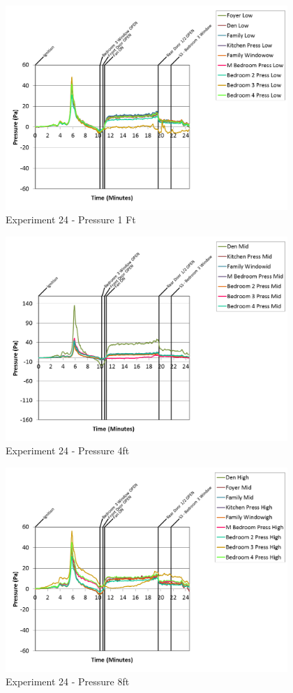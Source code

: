 \documentclass{article}
\begin{document}
\begin{appendices}
\begin{figure}[h!]
	\centering
	\includegraphics[height=3.05in]{0_Images/Results_Charts/Exp_24_Charts/Pressure1Ft.png}
	\caption{Experiment 24 - Pressure 1 Ft}
\end{figure}

\clearpage

\begin{figure}[h!]
	\centering
	\includegraphics[height=3.05in]{0_Images/Results_Charts/Exp_24_Charts/Pressure4ft.png}
	\caption{Experiment 24 - Pressure 4ft}
\end{figure}


\begin{figure}[h!]
	\centering
	\includegraphics[height=3.05in]{0_Images/Results_Charts/Exp_24_Charts/Pressure8ft.png}
	\caption{Experiment 24 - Pressure 8ft}
\end{figure}


\end{appendices}
\end{document}
